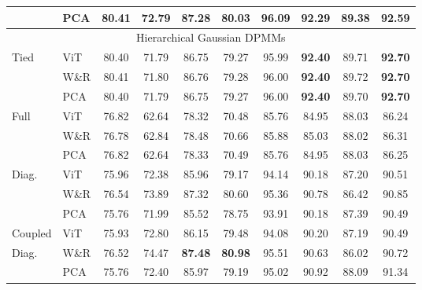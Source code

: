 \begin{table}[!h]
\begin{small}
\begin{center}
\begin{tabular}{llcccccccc}
     & PCA & 80.41 & 72.79 & 87.28 & 80.03 & \textbf{96.09} & 92.29 & 89.38 & 92.59 \\
\midrule
\multicolumn{10}{c}{Hierarchical Gaussian DPMMs}  \\
\midrule
Tied  & ViT & 80.40 & 71.79 & 86.75 & 79.27 & 95.99 & \textbf{92.40} & 89.71 & \textbf{92.70} \\
      & W\&R & 80.41 & 71.80 & 86.76 & 79.28 & 96.00 & \textbf{92.40} & 89.72 & \textbf{92.70} \\
      & PCA & 80.40 & 71.79 & 86.75 & 79.27 & 96.00 & \textbf{92.40} & 89.70 & \textbf{92.70} \\
\midrule
Full & ViT & 76.82 & 62.64 & 78.32 & 70.48 & 85.76 & 84.95 & 88.03 & 86.24 \\
 & W\&R & 76.78 & 62.84 & 78.48 & 70.66 & 85.88 & 85.03 & 88.02 & 86.31 \\
 & PCA & 76.82 & 62.64 & 78.33 & 70.49 & 85.76 & 84.95 & 88.03 & 86.25 \\
\midrule
Diag. & ViT & 75.96 & 72.38 & 85.96 & 79.17 & 94.14 & 90.18 & 87.20 & 90.51 \\
      & W\&R & 76.54 & 73.89 & 87.32 & 80.60 & 95.36 & 90.78 & 86.42 & 90.85 \\
      & PCA & 75.76 & 71.99 & 85.52 & 78.75 & 93.91 & 90.18 & 87.39 & 90.49 \\
\midrule
Coupled & ViT & 75.93 & 72.80 & 86.15 & 79.48 & 94.08 & 90.20 & 87.19 & 90.49 \\
Diag.   & W\&R & 76.52 & 74.47 & \textbf{87.48} & \textbf{80.98} & 95.51 & 90.63 & 86.02 & 90.72 \\
        & PCA & 75.76 & 72.40 & 85.97 & 79.19 & 95.02 & 90.92 & 88.09 & 91.34 \\
\bottomrule
\end{tabular}
\end{center}
\end{small}
\end{table}

